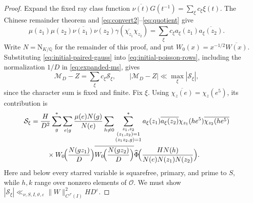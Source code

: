 \documentclass[11pt,a4paper]{article}
\numberwithin{equation}{section}
\numberwithin{figure}{section}
\theoremstyle{definition}
\theoremstyle{remark}
\newcommand{\Q}{\mathbb Q}
\newcommand{\NK}{\mathrm N_{K/\Q}}
\newcommand{\OO}{\mathcal O}
\begin{document}
\begin{proof}
Expand the fixed ray class function
$\overline{\nu(t)}G(t^{-1})=\sum_\xi c_\xi\xi(t)$.
The Chinese remainder theorem and
\eqref{eq:convert2}--\eqref{eq:quotient} give
\begin{equation}\label{eq:initial-paired-gauss}
 \mu(z_1)\mu(z_2)\overline{\nu(z_1)}\nu(z_2)
       \gamma(\overline{\chi_{z_1}}\chi_{z_2}) =\sum_\xi c_\xi a_\xi(z_1)\overline{a_\xi(z_2)}.
\end{equation}
Write $N=\NK$ for the remainder of this proof, and put
$W_0(x)=x^{-1/2}\overline{W(x)}$. Substituting
\eqref{eq:initial-paired-gauss} into \eqref{eq:initial-poisson-rows},
including the normalization $1/D$ in \eqref{eq:expanded-ms}, gives
\[
 \mathcal M_D-Z=\sum_\xi c_\xi\mathcal S_\xi,
 \qquad
 |\mathcal M_D-Z|\ll\max_\xi|\mathcal S_\xi|,
\]
since the character sum is fixed and finite. Fix $\xi$. Using
$\overline{\chi_z(e)}=\chi_z(e^5)$, its contribution is
\[
 \begin{aligned}
 \mathcal S_\xi
 ={}&\frac H{D^2}
 \sum_g^*\sum_{e\mid g}\frac{\mu(e)N(g)}{N(e)}
 \sum_{h\ne0}
 \sum_{\substack{z_1,z_2\\(z_1,z_2)=1\\(z_1z_2,g)=1}}^*
 a_\xi(z_1)\overline{a_\xi(z_2)}
 \chi_{z_1}(he^5)\overline{\chi_{z_2}(he^5)}
 \\
 &\quad{}\times
 W_0\!\Bigl(\frac{N(gz_1)}D\Bigr)
 \overline{W_0\!\Bigl(\frac{N(gz_2)}D\Bigr)}
 \widehat\Phi\!\Bigl(
 \frac{HN(h)}{N(e)N(z_1)N(z_2)}
 \Bigr).
 \end{aligned}
\]
Here and below every starred variable is squarefree, primary, and
prime to $S$, while $h,k$ range over nonzero elements of $\OO$.
We must show
$|\mathcal S_\xi|\ll_{\nu,S,I,\vartheta,\varepsilon}
\|W\|_{C^{J'}(I)}^2HD^\varepsilon$.


\end{proof}
\end{document}

